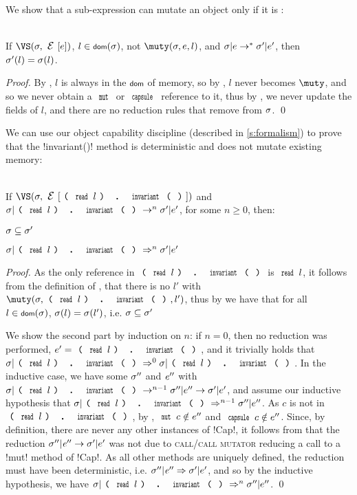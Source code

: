 	\noindent We show that a sub-expression can mutate an object only if it is \muty:
	
	\SS\begin{Lemma}\ \\
		\indent If $\VS(\s,\E[e])$, $l \in \dom(\s)$, not $\muty(\s, e, l)$, and $\sigma|e \rightarrow^* \sigma'|e'$, then $\sigma'(l) = \sigma(l)$.
	\end{Lemma}
	\SS\begin{proof}
		By , $l$ is always in the $\dom$ of memory, so 
		by , $l$ never becomes $\muty$, and so we never obtain a $\Kw{mut}$ or $\Kw{capsule}$ reference to it, thus by , we never update the fields of $l$, and there are no reduction rules that remove from $\sigma$.
		\qed\end{proof}
	\LS
	
		We can use our object capability discipline (described in \autoref{s:formalism}) to prove that the \Q!invariant()! method is deterministic and does not mutate existing memory:%
	
\SS\begin{Lemma}[Determinism]\ \\
	\indent If $\VS(\s, \E[\invariant{l}])$ and $\s|\invariant{l} \rightarrow^{n} \s'|e'$, for some $n \geq 0$, then:
	\begin{iitemize}
		\item $\sigma \subseteq \sigma'$\SS
		\item $\s|\invariant{l} \Rightarrow^{n} \s'|e'$
	\end{iitemize}
	\end{Lemma}\SS
	\begin{proof}
	As the only reference in $\invariant{l}$ is $\Kw{read}\,l$, it follows from the definition of \muty, that there is no $l'$ with $\muty(\s, \invariant{l}, l')$, thus by  we have that for all $l \in \dom(\s)$, $\sigma(l) = \sigma(l')$, i.e. $\sigma \subseteq \sigma'$

	We show the second part by induction on $n$: if $n = 0$, then no reduction was performed, $e' = \invariant{l}$, and it trivially holds that $\s|\invariant{l} \Rightarrow^{0} \s|\invariant{l}$. In the inductive case, we have some $\sigma''$ and ${\mathit{e}}''$ with $\s|\invariant{l} \rightarrow^{n - 1} \s''|e'' \rightarrow \s'|e'$, and assume our inductive hypothesis that $\s|\invariant{l} \Rightarrow^{n - 1} \s''|e''$.
	As $c$ is not \muty in $\invariant{l}$, by , $\Kw{mut}\,c \notin e''$ and $\Kw{capsule}\,c \notin e''$. Since, by definition, there are never any other instances of \Q!Cap!, it follows from  that the reduction $\sigma''|{\mathit{e}}'' \rightarrow \sigma'|e'$ was not due to \textsc{call/call mutator} reducing a call to a \Q!mut! method of \Q!Cap!.
	As all other methods are uniquely defined, the reduction must have been deterministic, i.e.  $\sigma''|{\mathit{e}}'' \Rightarrow \sigma'|e'$, and so by the inductive hypothesis, we have $\s|\invariant{l} \Rightarrow^{n} \s''|e''$.
	\qed\end{proof}

